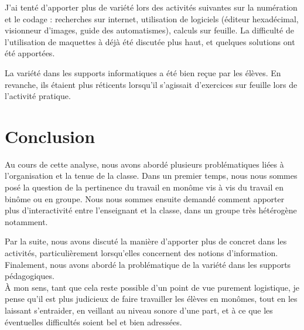 \documentclass[pdftex,a4paper,12pt]{article}
\begin{document}
	J'ai tenté d'apporter plus de variété lors des activités suivantes sur la numération et le codage : 
	recherches sur internet, utilisation de logiciels (éditeur hexadécimal, visionneur d'images, \og{}guide des automatismes\fg{}), calculs sur feuille.
	La difficulté de l'utilisation de maquettes à déjà été discutée plus haut, et quelques solutions ont été apportées.

	La variété dans les supports informatiques a été bien reçue par les élèves.
	En revanche, ils étaient plus réticents lorsqu'il s'agissait d'exercices sur feuille lors de l'activité pratique.


	\section{Conclusion}
	Au cours de cette analyse, nous avons abordé plusieurs problématiques liées à l'organisation et la tenue de la classe.
	Dans un premier temps, nous nous sommes posé la question de la pertinence du travail en monôme vis à vis du travail en binôme ou en groupe.
	Nous nous sommes ensuite demandé comment apporter plus d'interactivité entre l'enseignant et la classe, dans un groupe très hétérogène notamment.

	Par la suite, nous avons discuté la manière d'apporter plus de concret dans les activités, particulièrement lorsqu'elles concernent des notions d'information.
	Finalement, nous avons abordé la problématique de la variété dans les supports pédagogiques.\\

	À mon sens, tant que cela reste possible d'un point de vue purement logistique, je pense qu'il est plus judicieux de faire travailler les élèves en monômes,
	tout en les laissant s'entraider, en veillant au niveau sonore d'une part, et à ce que les éventuelles difficultés soient bel et bien adressées.\\
\end{document}
